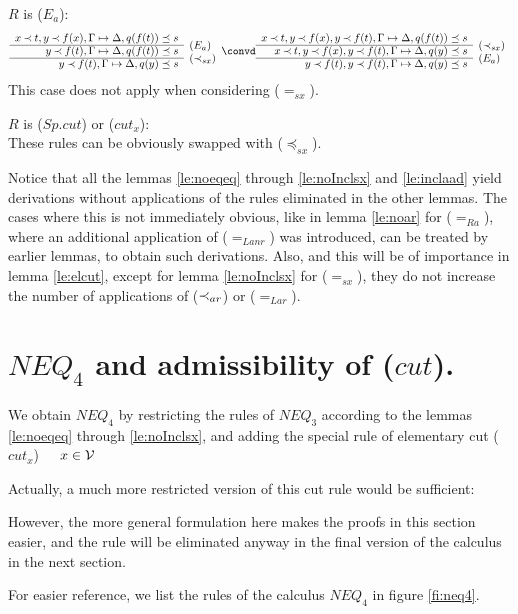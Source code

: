 \begin{PROOF}
\begin{LS}
%
\item $R$ is ($E_a$):
\[ \begin{array}{rl}
 x\Incl t, y\Incl f(x),  \GSD, q(f(t))\preceq s \\ \cline{1-1}
 y\Incl f(t),  \GSD, q(f(t))\preceq s & \rabove{(E_a)} \\ \cline{1-1}
 y\Incl f(t),  \GSD, q(y)\preceq s & \rabove{(\Incl_{sx})} \end{array} \convd
 \begin{array}{rl}
 x\Incl t, y\Incl f(x), y\Incl f(t), \GSD, q(f(t))\preceq s \\ \cline{1-1}
 x\Incl t, y\Incl f(x), y\Incl f(t), \GSD, q(y)\preceq s & \rabove{(\Incl_{sx})} \\ \cline{1-1}
 y\Incl f(t),  y\Incl f(t), \GSD, q(y)\preceq s & \rabove{(E_a)} \end{array}
 \]
This case does not apply when considering ($=_{sx}$).
%
\item $R$ is ($Sp.cut$) or ($cut_x$):\\
These rules can be obviously swapped with ($\preceq_{sx}$).
\end{LS}
\end{PROOF}
\noindent
%
%
\begin{REMARK}\label{re:noincrease}
Notice that all the lemmas \ref{le:noeqeq} through \ref{le:noInclsx} and
\ref{le:inclaad} yield
derivations without applications of the rules eliminated in the other
lemmas. The cases where this is not immediately obvious, like in lemma \ref{le:noar} for
($=_{Ra}$), where an additional application of ($=_{Lanr}$) was introduced,
can be treated by earlier lemmas, to obtain such derivations. 
Also, and this will be of importance in lemma \ref{le:elcut}, except for
lemma \ref{le:noInclsx} for ($=_{sx}$), they do not
increase the number of applications of ($\mathbin{\prec}_{ar}$) or ($=_{Lar}$).
\end{REMARK}

\section{$NEQ_4$ and admissibility of ($cut$).}
%
\begin{DEFINITION}\label{de:neq4}
We obtain $NEQ_4$ by restricting the rules of $NEQ_3$
according to the lemmas \ref{le:noeqeq} through \ref{le:noInclsx}, and
adding the special  rule of elementary cut 
 ($cut_x$)\ \
\ $x\in{\cal V}$ \label{ru:cutx} 
\end{DEFINITION}
\begin{REMARK}\label{re:cutx}
Actually, a much more restricted
version of this cut rule would be sufficient: 
\begin{center}  \end{center}
However, the more general formulation here makes
the proofs in this section easier, and the rule will be eliminated anyway in the
final version of the calculus in the next section.
\end{REMARK}
\noindent
For easier reference, we list the rules of the calculus $NEQ_4$ in figure
\ref{fi:neq4}.

